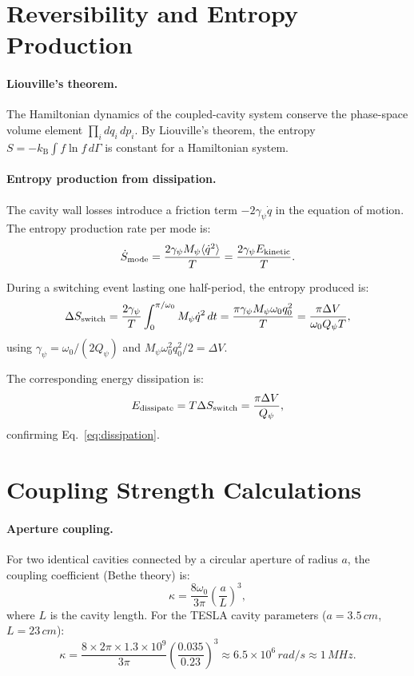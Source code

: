\documentclass[12pt,a4paper,twoside]{article}
\newcommand{\kB}{k_{\mathrm{B}}}
\begin{document}
\begin{appendices}
\section{Reversibility and Entropy Production}\label{app:reversibility}

\paragraph{Liouville's theorem.} The Hamiltonian dynamics of the coupled-cavity system conserve the phase-space volume element $\prod_i dq_i\,dp_i$. By Liouville's theorem, the entropy $S = -\kB \int f \ln f\,d\Gamma$ is constant for a Hamiltonian system.

\paragraph{Entropy production from dissipation.} The cavity wall losses introduce a friction term $-2\gamma_\psi \dot{q}$ in the equation of motion. The entropy production rate per mode is:
\begin{equation}
\dot{S}_{\rm mode} = \frac{2\gamma_\psi M_\psi \langle\dot{q}^2\rangle}{T} = \frac{2\gamma_\psi E_{\rm kinetic}}{T}.
\end{equation}

During a switching event lasting one half-period, the entropy produced is:
\begin{equation}
\Delta S_{\rm switch} = \frac{2\gamma_\psi}{T}\int_0^{\pi/\omega_0} M_\psi\dot{q}^2\,dt = \frac{\pi\gamma_\psi M_\psi\omega_0 q_0^2}{T} = \frac{\pi\Delta V}{\omega_0 Q_\psi T},
\end{equation}
using $\gamma_\psi = \omega_0/(2Q_\psi)$ and $M_\psi\omega_0^2 q_0^2/2 = \Delta V$.

The corresponding energy dissipation is:
\begin{equation}
E_{\rm dissipate} = T\Delta S_{\rm switch} = \frac{\pi\Delta V}{Q_\psi},
\end{equation}
confirming Eq.~\eqref{eq:dissipation}.

\section{Coupling Strength Calculations}\label{app:coupling}

\paragraph{Aperture coupling.} For two identical cavities connected by a circular aperture of radius $a$, the coupling coefficient (Bethe theory) is:
\begin{equation}
\kappa = \frac{8\omega_0}{3\pi}\left(\frac{a}{L}\right)^3,
\end{equation}
where $L$ is the cavity length. For the TESLA cavity parameters ($a = 3.5\,\si{cm}$, $L = 23\,\si{cm}$):
\begin{equation}
\kappa = \frac{8 \times 2\pi \times 1.3 \times 10^9}{3\pi}\left(\frac{0.035}{0.23}\right)^3 \approx 6.5 \times 10^6\,\si{rad/s} \approx 1\,\si{MHz}.
\end{equation}


\end{appendices}
\end{document}
